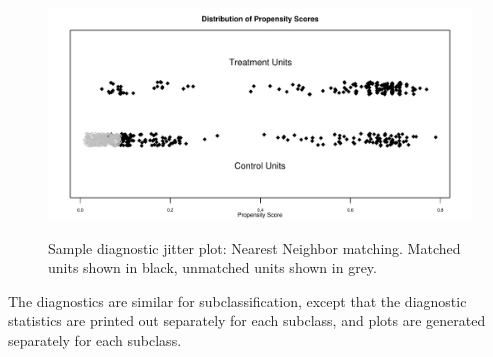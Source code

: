 \documentclass[oneside,letterpaper,titlepage]{article}
\begin{document}
\begin{figure}[tbp]
  \begin{center}
    {\includegraphics[scale=0.5]{figs/jitterplotnn}}
    \hfill
    \caption{Sample diagnostic jitter plot: Nearest Neighbor matching.
      Matched units shown in black, unmatched units shown in grey.}
\label{diagjitternn}
\end{center}
\end{figure}

The diagnostics are similar for subclassification, except that the
diagnostic statistics are printed out separately for each subclass,
and plots are generated separately for each subclass.
\end{document}
